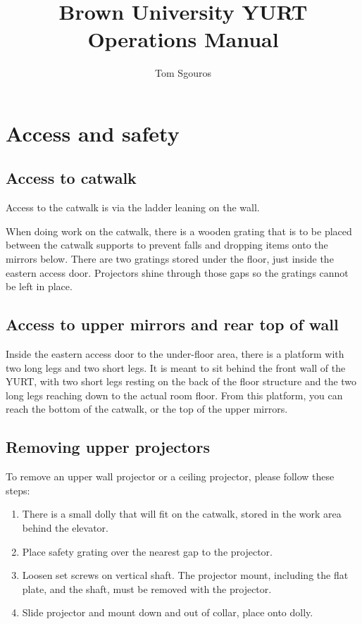 \documentclass[11pt]{article}
\newcommand{\yurt}{YURT}
\begin{document}
\title{Brown University YURT Operations Manual}
\author{Tom Sgouros}
\maketitle

\tableofcontents

\setlength{\parskip}{10pt}
\setlength{\parindent}{0pt}

\section{Access and safety}

\subsection{Access to catwalk}

Access to the catwalk is via the ladder leaning on the wall.

When doing work on the catwalk, there is a wooden grating that is to
be placed between the catwalk supports to prevent falls and dropping
items onto the mirrors below.  There are two gratings stored under the
floor, just inside the eastern access door.  Projectors shine through
those gaps so the gratings cannot be left in place.

\subsection{Access to upper mirrors and rear top of wall}

Inside the eastern access door to the under-floor area, there is a
platform with two long legs and two short legs. It is meant to sit
behind the front wall of the \yurt, with two short legs resting on the
back of the floor structure and the two long legs reaching down to the
actual room floor.  From this platform, you can reach the bottom of
the catwalk, or the top of the upper mirrors.

\subsection{Removing upper projectors}

To remove an upper wall projector or a ceiling projector, please
follow these steps:

\begin{enumerate}
\item There is a small dolly that will fit on the catwalk, stored in
  the work area behind the elevator.

\item Place safety grating over the nearest gap to the projector.

\item Loosen set screws on vertical shaft.  The projector mount,
  including the flat plate, and the shaft, must be removed with the
  projector.

\item Slide projector and mount down and out of collar, place onto
  dolly.
\end{enumerate}
\end{document}
